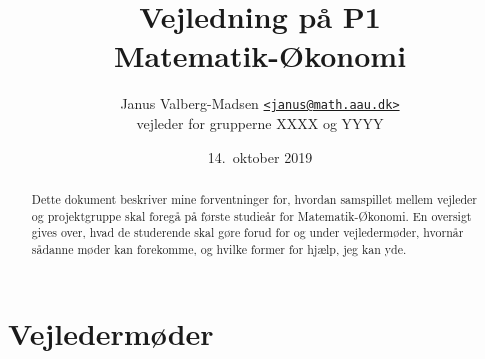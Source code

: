 \documentclass[12pt,a4paper,oneside,final]{article}
\title{
  Vejledning p{\aa} P1\\
  Matematik-{\O}konomi
}
\author{
  Janus Valberg-Madsen \href{mailto:janus@math.aau.dk}{\texttt{<janus@math.aau.dk>}}\\
  vejleder for grupperne XXXX og YYYY
}
\date{14.\ oktober 2019}
\begin{document}
\maketitle

\renewcommand{\abstractname}{Om dette dokument}
\begin{abstract}
  Dette dokument beskriver mine forventninger for, hvordan samspillet mellem vejleder og projektgruppe skal foregå på første studieår for Matematik-Økonomi.
  En oversigt gives over, hvad de studerende skal gøre forud for og under vejledermøder, hvornår sådanne møder kan forekomme, og hvilke former for hjælp, jeg kan yde.
\end{abstract}


\section{Vejledermøder}
\end{document}
